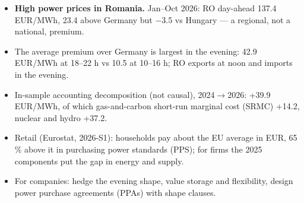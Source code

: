 \begin{itemize}\setlength{\itemsep}{2pt}
  \item \textbf{High power prices in Romania.} Jan--Oct 2026: RO day-ahead 137.4 EUR/MWh, 23.4 above Germany but $-$3.5 vs Hungary --- a regional, not a national, premium.
  \item The average premium over Germany is largest in the evening: 42.9 EUR/MWh at 18--22 h vs 10.5 at 10--16 h; RO exports at noon and imports in the evening.
  \item In-sample accounting decomposition (not causal), 2024$\to$2026: +39.9 EUR/MWh, of which gas-and-carbon short-run marginal cost (SRMC) +14.2, nuclear and hydro +37.2.
  \item Retail (Eurostat, 2026-S1): households pay about the EU average in EUR, 65\,\% above it in purchasing power standards (PPS); for firms the 2025 components put the gap in energy and supply.
  \item For companies: hedge the evening shape, value storage and flexibility, design power purchase agreements (PPAs) with shape clauses.
\end{itemize}
